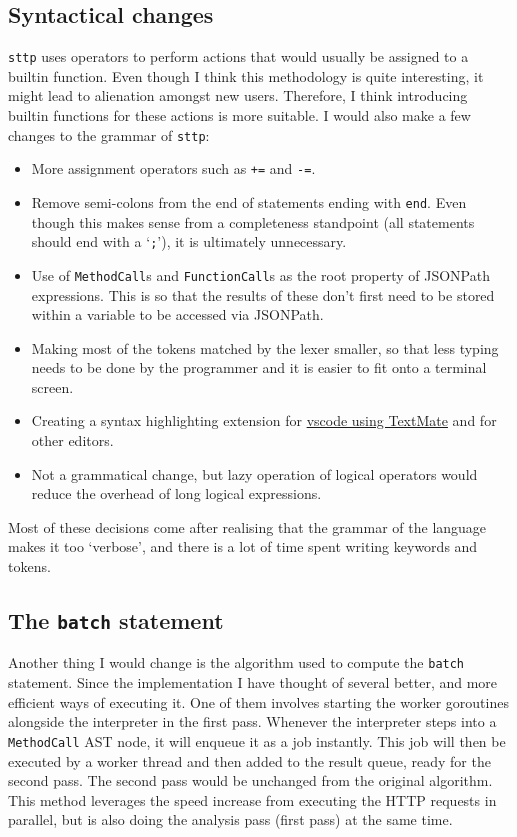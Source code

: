 \cprotect\subsection{Syntactical changes}

\verb|sttp| uses operators to perform actions that would usually be assigned to a builtin function. Even though I think this methodology is quite interesting, it might lead to alienation amongst new users. Therefore, I think introducing builtin functions for these actions is more suitable. I would also make a few changes to the grammar of \verb|sttp|:

\begin{itemize}
    \item More assignment operators such as \verb|+=| and \verb|-=|.
    \item Remove semi-colons from the end of statements ending with \verb|end|. Even though this makes sense from a completeness standpoint (all statements should end with a `\verb|;|'), it is ultimately unnecessary.
    \item Use of \verb|MethodCall|s and \verb|FunctionCall|s as the root property of JSONPath expressions. This is so that the results of these don't first need to be stored within a variable to be accessed via JSONPath.
    \item Making most of the tokens matched by the lexer smaller, so that less typing needs to be done by the programmer and it is easier to fit onto a terminal screen.
    \item Creating a syntax highlighting extension for \href{https://code.visualstudio.com/api/language-extensions/syntax-highlight-guide}{vscode using TextMate} and for other editors.
    \item Not a grammatical change, but lazy operation of logical operators would reduce the overhead of long logical expressions.
\end{itemize}

Most of these decisions come after realising that the grammar of the language makes it too `verbose', and there is a lot of time spent writing keywords and tokens.

\cprotect\subsection{The \verb|batch| statement}
\label{sec:evaluation-batch-optimisation}

Another thing I would change is the algorithm used to compute the \verb|batch| statement. Since the implementation I have thought of several better, and more efficient ways of executing it. One of them involves starting the worker goroutines alongside the interpreter in the first pass. Whenever the interpreter steps into a \verb|MethodCall| AST node, it will enqueue it as a job instantly. This job will then be executed by a worker thread and then added to the result queue, ready for the second pass. The second pass would be unchanged from the original algorithm. This method leverages the speed increase from executing the HTTP requests in parallel, but is also doing the analysis pass (first pass) at the same time.

